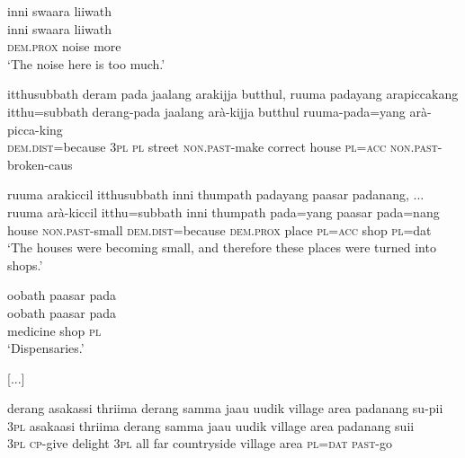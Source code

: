 \ea \label{K051222nar04.37}
\glll
 inni swaara liiwath\\
 inni swaara liiwath\\
 \textsc{dem.prox} noise more\\
`The noise here is too much.'
\z


\ea \label{K051222nar04.38}
\glll
 itthusubbath deram pada jaalang arakijja butthul, ruuma padayang arapiccakang\\
 itthu=subbath derang-pada jaalang arà-kijja butthul ruuma-pada=yang arà-picca-king\\
 \textsc{dem.dist}=because \textsc{3pl} \textsc{pl} street \textsc{non.past}-make correct house \textsc{pl}=\textsc{acc} \textsc{non.past}-broken-caus\\
\z


\ea \label{K051222nar04.39}
\glll
 ruuma arakiccil itthusubbath inni thumpath padayang paasar padanang, ...\\
 ruuma arà-kiccil itthu=subbath inni thumpath pada=yang paasar pada=nang\\
 house \textsc{non.past}-small \textsc{dem.dist}=because \textsc{dem.prox} place  \textsc{pl}=\textsc{acc} shop  \textsc{pl}=dat\\
`The houses were becoming small, and therefore these places were turned into shops.'
\z


\ea \label{K051222nar04.40}
\glll
 oobath paasar pada \\ 
 oobath paasar pada   \\
 medicine shop  \textsc{pl}       \\
`Dispensaries.'
\z

[...]

\ea \label{K051222nar04.41}
\glll
 derang asakassi thriima derang samma jaau uudik village area padanang su-pii \\
 \textsc{3pl} asakaasi thriima derang samma jaau uudik village area padanang suii\\
 \textsc{3pl} \textsc{cp}-give delight \textsc{3pl} all far countryside village area \textsc{pl}=\textsc{dat} \textsc{past}-go\\
\z

